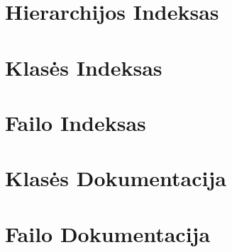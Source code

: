 \usepackage[utf8]{inputenc}

\chapter{Hierarchijos Indeksas}

\chapter{Klasės Indeksas}

\chapter{Failo Indeksas}

\chapter{Klasės Dokumentacija}


\chapter{Failo Dokumentacija}





  \backmatter
  \newpage
  \clearemptydoublepage
  \printindex

